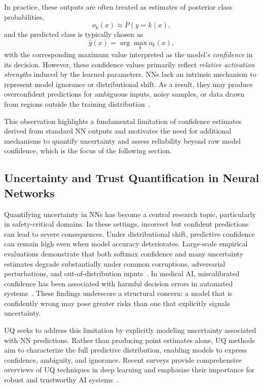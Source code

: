 In practice, these outputs are often treated as estimates of posterior class probabilities,
\[
o_k(x) \approx P(y = k \mid x),
\]
and the predicted class is typically chosen as
\[
\hat{y}(x) = \arg\max_k o_k(x),
\]
with the corresponding maximum value interpreted as the model’s \emph{confidence} in its decision. However, these confidence values primarily reflect \emph{relative activation strengths} induced by the learned parameters. \acp{NN} lack an intrinsic mechanism to represent model ignorance or distributional shift. 
As a result, they may produce overconfident predictions for ambiguous inputs, noisy samples, or data drawn from regions outside the training distribution~\cite{bishop2006pattern,ovadia2019trustmodelsuncertaintyevaluating}.

This observation highlights a fundamental limitation of confidence estimates derived from standard \ac{NN} outputs and motivates the need for additional mechanisms to quantify uncertainty and assess reliability beyond raw model confidence, which is the focus of the following section.

\subsection{Uncertainty and Trust Quantification in Neural Networks}
\label{sec:uq_nn}

Quantifying uncertainty in \acp{NN} has become a central research topic, particularly in safety-critical domains. In these settings, incorrect but confident predictions can lead to severe consequences. Under distributional shift, predictive confidence can remain high even when model accuracy deteriorates. 
Large-scale empirical evaluations demonstrate that both softmax confidence and many uncertainty estimates degrade substantially under common corruptions, adversarial perturbations, and out-of-distribution inputs~\cite{ovadia2019trustmodelsuncertaintyevaluating}. 
In medical AI, miscalibrated confidence has been associated with harmful decision errors in automated systems~\cite{begoli2019need,wolf2025medvlms}. These findings underscore a structural concern: a model that is confidently wrong may pose greater risks than one that explicitly signals uncertainty.


\ac{UQ} seeks to address this limitation by explicitly modeling uncertainty associated with \ac{NN} predictions. Rather than producing point estimates alone, \ac{UQ} methods aim to characterize the full predictive distribution, enabling models to express confidence, ambiguity, and ignorance. Recent surveys provide comprehensive overviews of \ac{UQ} techniques in deep learning and emphasize their importance for robust and trustworthy AI systems~\cite{Gawlikowski2023,ABDAR2021243}.


